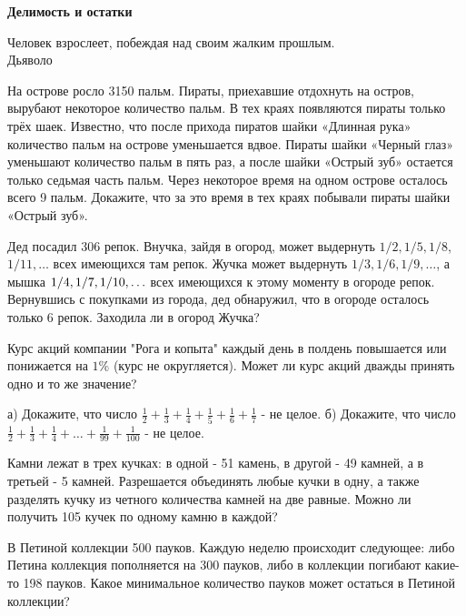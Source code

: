 \centerline{\bf \Huge Делимость и остатки}

\begin{flushright}
        \scriptsize{Человек взрослеет, побеждая над своим жалким прошлым.
                    \\Дьяволо}
\end{flushright}

На острове росло 3150 пальм. Пираты, приехавшие отдохнуть на остров, вырубают некоторое количество пальм. В тех краях появляются пираты только трёх шаек. Известно, что после прихода пиратов шайки «Длинная рука» количество пальм на острове уменьшается вдвое. Пираты шайки «Черный глаз» уменьшают количество пальм в пять раз, а после шайки «Острый зуб» остается только седьмая часть пальм. Через некоторое время на одном острове осталось всего 9 пальм. Докажите, что за это время в тех краях побывали пираты шайки «Острый зуб».


Дед посадил 306 репок. Внучка, зайдя в огород, может выдернуть $1 / 2,1 / 5,1 / 8$, $1 / 11, \ldots$ всех имеющихся там репок. Жучка может выдернуть $1 / 3,1 / 6,1 / 9, \ldots$, а мышка $1 / 4,\\1 / 7,1 / 10, \ldots$ всех имеющихся к этому моменту в огороде репок. Вернувшись с покупками из города, дед обнаружил, что в огороде осталось только 6 репок. Заходила ли в огород Жучка?


Курс акций компании "Рога и копыта" каждый день в полдень повышается или понижается на $1 \%$ (курс не округляется). Может ли курс акций дважды принять одно и то же значение?


а) Докажите, что число $\frac{1}{2}+\frac{1}{3}+\frac{1}{4}+\frac{1}{5}+\frac{1}{6}+\frac{1}{7}$ - не целое.
б) Докажите, что число $\frac{1}{2}+\frac{1}{3}+\frac{1}{4}+ \ldots+\frac{1}{99}+\frac{1}{100}$ - не целое.


Камни лежат в трех кучках: в одной - 51 камень, в другой - 49 камней, а в третьей - 5 камней. Разрешается объединять любые кучки в одну, а также разделять кучку из четного количества камней на две равные. Можно ли получить 105 кучек по одному камню в каждой?


В Петиной коллекции 500 пауков. Каждую неделю происходит следующее: либо Петина коллекция пополняется на 300 пауков, либо в коллекции погибают какие-то 198 пауков. Какое минимальное
количество пауков может остаться в Петиной коллекции?